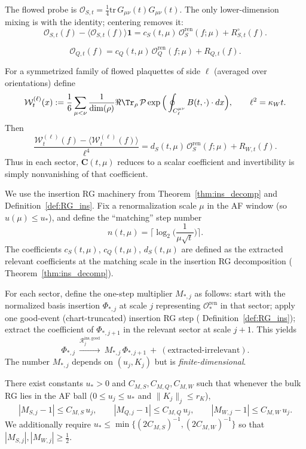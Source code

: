 The flowed probe is $\mathcal O_{S,t}=\tfrac14\mathrm{tr}\,G_{\mu\nu}(t)G_{\mu\nu}(t)$.
The only lower-dimension mixing is with the identity; centering removes it:
\[
\mathcal O_{S,t}(f)-\langle \mathcal O_{S,t}(f)\rangle\mathbf 1
= c_S(t,\mu)\,\mathcal O_S^{\mathrm{ren}}(f;\mu) + R_{S,t}^{\circ}(f).
\]

\[
\mathcal O_{Q,t}(f)=c_Q(t,\mu)\,\mathcal O_Q^{\mathrm{ren}}(f;\mu) + R_{Q,t}(f).
\]

For a symmetrized family of flowed plaquettes of side $\ell$ (averaged over orientations) define
\[
\mathcal W_t^{(\ell)}(x):=\frac{1}{6}\sum_{\mu<\nu}\frac{1}{\dim(\rho)}\Re\Tr_{\rho}\, \mathcal P \exp\Big(\oint_{C^{\mu\nu}_\ell} B(t,\cdot)\cdot d x\Big),
\qquad
\ell^2=\kappa_W t.
\]
Then
\[
\frac{\mathcal W_t^{(\ell)}(f)-\langle \mathcal W_t^{(\ell)}(f)\rangle}{\ell^4}
=
d_S(t,\mu)\,\mathcal O_S^{\mathrm{ren}}(f;\mu) + R_{W,t}(f).
\]
Thus in each sector, $\mathbf C(t,\mu)$ reduces to a scalar coefficient and invertibility is simply nonvanishing of that coefficient.

We use the insertion RG machinery from Theorem~\ref{thm:ins_decomp} and Definition~\ref{def:RG_ins}. Fix a renormalization scale $\mu$ in the AF window (so $u(\mu)\le u_\ast$),
and define the ``matching'' step number
\[
n(t,\mu)=\Big\lceil \log_2\Big(\frac{1}{\mu\sqrt t}\Big)\Big\rceil.
\]
The coefficients $c_S(t,\mu)$, $c_Q(t,\mu)$, $d_S(t,\mu)$ are defined as the extracted relevant coefficients at the matching scale
in the insertion RG decomposition ( Theorem~\ref{thm:ins_decomp}).

For each sector, define the one-step multiplier $M_{*,j}$ as follows:
start with the normalized basis insertion $\Phi_{*,j}$ at scale $j$ representing $\mathcal O_*^{\mathrm{ren}}$ in that sector;
apply one good-event (chart-truncated) insertion RG step ( Definition~\ref{def:RG_ins});
extract the coefficient of $\Phi_{*,j+1}$ in the relevant sector at scale $j+1$.
This yields
\[
\Phi_{*,j}\ \xrightarrow{\mathcal R^{\mathrm{ins,good}}_j}\ M_{*,j}\,\Phi_{*,j+1}\ +\ (\text{extracted-irrelevant}).
\]
The number $M_{*,j}$ depends on $(u_j,K_j)$ but is \emph{finite-dimensional}.

\begin{proposition}\label{prop:mult_bound}
There exist constants $u_\ast>0$ and $C_{M,S},C_{M,Q},C_{M,W}$ such that whenever the bulk RG lies in the AF ball
($0\le u_j\le u_\ast$ and $\|K_j\|_j\le r_K$),
\begin{equation}\label{eq:M_bounds}
|M_{S,j}-1|\le C_{M,S}\,u_j,\qquad
|M_{Q,j}-1|\le C_{M,Q}\,u_j,\qquad
|M_{W,j}-1|\le C_{M,W}\,u_j.
\end{equation}
We additionally require $u_\ast\le \min\{(2C_{M,S})^{-1},(2C_{M,W})^{-1}\}$ so that $|M_{S,j}|,|M_{W,j}|\ge \tfrac12$.
\end{proposition}

